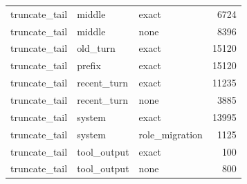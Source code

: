 \begin{tabular}{lllr}
truncate_tail & middle & exact & 6724 \\
truncate_tail & middle & none & 8396 \\
truncate_tail & old_turn & exact & 15120 \\
truncate_tail & prefix & exact & 15120 \\
truncate_tail & recent_turn & exact & 11235 \\
truncate_tail & recent_turn & none & 3885 \\
truncate_tail & system & exact & 13995 \\
truncate_tail & system & role_migration & 1125 \\
truncate_tail & tool_output & exact & 100 \\
truncate_tail & tool_output & none & 800 \\
\bottomrule
\end{tabular}

